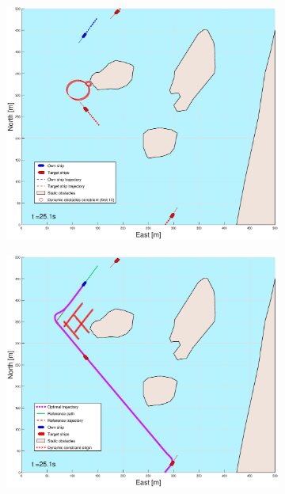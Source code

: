 \clearpage
\begin{figure}[!ht] %
    \begin{subfigure}[b]{0.49\textwidth}
        \centering
        \includegraphics[width=\textwidth]{Images/Figures/Helloya_Rev/_Simple_0fig1_time=25}
    \end{subfigure}
    \hfill
    \begin{subfigure}[b]{0.499\textwidth}
        \centering
        \includegraphics[width=\textwidth]{Images/Figures/Helloya_Rev/_Simple_0fig999_time=25}

\end{subfigure}
\end{figure}
